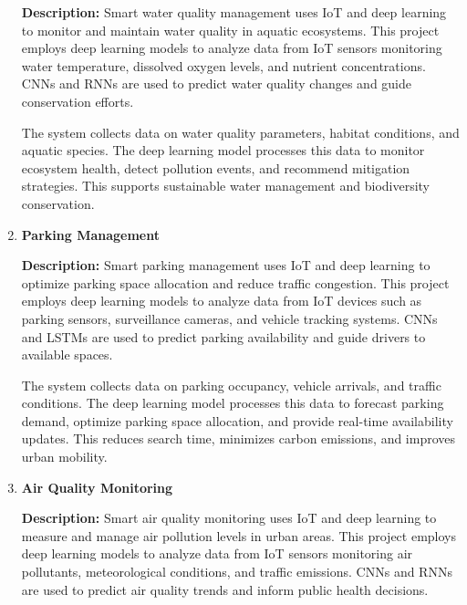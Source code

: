 \documentclass{article}
\begin{document}
\begin{enumerate}[label=\textbf{\arabic*.}, leftmargin=*]
\textbf{Description:}
Smart water quality management uses IoT and deep learning to monitor and maintain water quality in aquatic ecosystems. This project employs deep learning models to analyze data from IoT sensors monitoring water temperature, dissolved oxygen levels, and nutrient concentrations. CNNs and RNNs are used to predict water quality changes and guide conservation efforts.

The system collects data on water quality parameters, habitat conditions, and aquatic species. The deep learning model processes this data to monitor ecosystem health, detect pollution events, and recommend mitigation strategies. This supports sustainable water management and biodiversity conservation.



\vspace{24pt} %
\item \textbf{Parking Management}

\textbf{Description:}
Smart parking management uses IoT and deep learning to optimize parking space allocation and reduce traffic congestion. This project employs deep learning models to analyze data from IoT devices such as parking sensors, surveillance cameras, and vehicle tracking systems. CNNs and LSTMs are used to predict parking availability and guide drivers to available spaces.

The system collects data on parking occupancy, vehicle arrivals, and traffic conditions. The deep learning model processes this data to forecast parking demand, optimize parking space allocation, and provide real-time availability updates. This reduces search time, minimizes carbon emissions, and improves urban mobility.



\vspace{24pt} %
\item \textbf{Air Quality Monitoring}

\textbf{Description:}
Smart air quality monitoring uses IoT and deep learning to measure and manage air pollution levels in urban areas. This project employs deep learning models to analyze data from IoT sensors monitoring air pollutants, meteorological conditions, and traffic emissions. CNNs and RNNs are used to predict air quality trends and inform public health decisions.


\end{enumerate}
\end{document}

